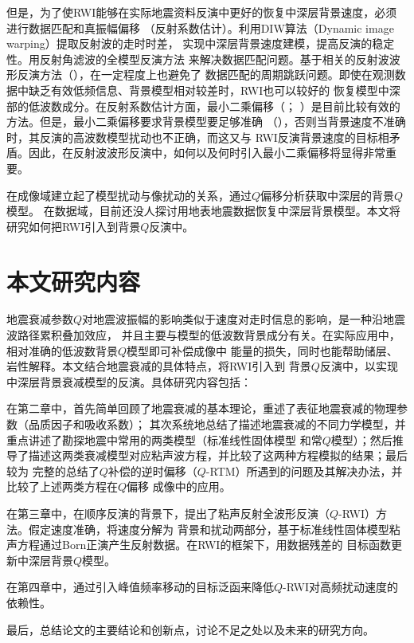 但是，为了使RWI能够在实际地震资料反演中更好的恢复中深层背景速度，必须进行数据匹配和真振幅偏移
（反射系数估计）。利用DIW算法（Dynamic image warping）提取反射波的走时时差，
实现中深层背景速度建模，提高反演的稳定性。用反射角滤波的全模型反演方法
来解决数据匹配问题。基于相关的反射波波形反演方法（），在一定程度上也避免了
数据匹配的周期跳跃问题。即使在观测数据中缺乏有效低频信息、背景模型相对较差时，RWI也可以较好的
恢复模型中深部的低波数成分。在反射系数估计方面，最小二乘偏移（；
）是目前比较有效的方法。但是，最小二乘偏移要求背景模型要足够准确
（），否则当背景速度不准确时，其反演的高波数模型扰动也不正确，而这又与
RWI反演背景速度的目标相矛盾。因此，在反射波波形反演中，如何以及何时引入最小二乘偏移将显得非常重要。

在成像域建立起了模型扰动与像扰动的关系，通过$Q$偏移分析获取中深层的背景$Q$模型。
在数据域，目前还没人探讨用地表地震数据恢复中深层背景模型。本文将研究如何把RWI引入到背景$Q$反演中。

\vspace{0.5cm}
\section{本文研究内容}
地震衰减参数$Q$对地震波振幅的影响类似于速度对走时信息的影响，是一种沿地震波路径累积叠加效应，
并且主要与模型的低波数背景成分有关。在实际应用中，相对准确的低波数背景$Q$模型即可补偿成像中
能量的损失，同时也能帮助储层、岩性解释。本文结合地震衰减的具体特点，将RWI引入到
背景$Q$反演中，以实现中深层背景衰减模型的反演。具体研究内容包括：

在第二章中，首先简单回顾了地震衰减的基本理论，重述了表征地震衰减的物理参数（品质因子和吸收系数）；
其次系统地总结了描述地震衰减的不同力学模型，并重点讲述了勘探地震中常用的两类模型（标准线性固体模型
和常$Q$模型）；然后推导了描述这两类衰减模型对应粘声波方程，并比较了这两种方程模拟的结果；最后较为
完整的总结了$Q$补偿的逆时偏移（$Q$-RTM）所遇到的问题及其解决办法，并比较了上述两类方程在$Q$偏移
成像中的应用。

在第三章中，在顺序反演的背景下，提出了粘声反射全波形反演（$Q$-RWI）方法。假定速度准确，将速度分解为
背景和扰动两部分，基于标准线性固体模型粘声方程通过Born正演产生反射数据。在RWI的框架下，用数据残差的
目标函数更新中深层背景$Q$模型。

在第四章中，通过引入峰值频率移动的目标泛函来降低$Q$-RWI对高频扰动速度的依赖性。

最后，总结论文的主要结论和创新点，讨论不足之处以及未来的研究方向。

















